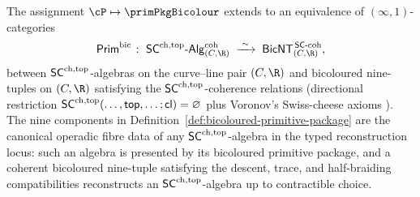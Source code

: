 \begin{theorem}
\label{thm:bicoloured-primitive-universality}%
%
%
The assignment $\cP \mapsto \primPkgBicolour$ extends to an equivalence
of $(\infty,1)$-categories
\begin{equation}\label{eq:primPkgBic-universality}
\mathsf{Prim}^{\mathrm{bic}}
 \;\colon\;
 \SCchtop\text{-}\mathsf{Alg}_{(C, \R)}^{\mathrm{coh}}
 \;\xrightarrow{\;\sim\;}\;
 \mathsf{BicNT}^{\,\mathsf{SC}\text{-coh}}_{(C, \R)},
\end{equation}
between $\mathsf{SC}^{\mathrm{ch},\mathrm{top}}$-algebras on the curve--line pair $(C, \R)$ and
bicoloured nine-tuples on $(C, \R)$ satisfying the
$\mathsf{SC}^{\mathrm{ch},\mathrm{top}}$-coherence relations \textup(directional restriction
$\mathsf{SC}^{\mathrm{ch},\mathrm{top}}(\ldots, \mathsf{top}, \ldots; \mathsf{cl}) = \varnothing$
plus Voronov's Swiss-cheese axioms \cite{Voronov1998}\textup). The
nine components in
Definition~\ref{def:bicoloured-primitive-package} are the canonical
	operadic fibre data of any
$\mathsf{SC}^{\mathrm{ch},\mathrm{top}}$-algebra in the typed reconstruction locus: such an
algebra is presented by its bicoloured primitive package, and a
coherent bicoloured nine-tuple satisfying the descent, trace, and
half-braiding compatibilities reconstructs an $\mathsf{SC}^{\mathrm{ch},\mathrm{top}}$-algebra up
to contractible choice.
\end{theorem}

